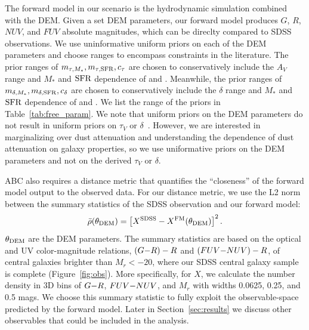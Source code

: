 The forward model in our scenario is the hydrodynamic simulation combined with
the DEM. Given a set DEM parameters, our forward model
produces $G$, $R$, $NUV$, and $FUV$ absolute magnitudes, which can be direclty
compared to SDSS observations. We use uninformative uniform priors on each of
the DEM parameters and choose ranges to encompass constraints in the
literature. The prior ranges of $m_{\tau,M_*}, m_{\tau,{\rm SFR}}, c_\tau$ are chosen to
conservatively include the $A_V$ range and $M_*$ and ${\rm SFR}$ dependence of
\cite{narayanan2018} and \cite{salim2020}. Meanwhile, the prior ranges of 
$m_{\delta,M_*}, m_{\delta,{\rm SFR}}, c_\delta$ are chosen to conservatively include the $\delta$
range and $M_*$ and ${\rm SFR}$ dependence of \cite{leja2017} and \cite{salim2018}. 
We list the range of the priors in Table~\ref{tab:free_param}. We note that
uniform priors on the DEM parameters do not result in uniform priors on
$\tau_V$ or $\delta$~\citep[\eg][]{handley2019}. However, we are interested in
marginalizing over dust attenuation and understanding the dependence of dust
attenuation on galaxy properties, so we use uniformative priors on the DEM
parameters and not on the derived $\tau_V$ or $\delta$. 

ABC also requires a distance metric that quantifies the ``closeness'' of the
forward model output to the observed data. For our distance metric, we use the
L2 norm between the summary statistics of the SDSS observation and our forward
model: 
\begin{equation} \label{eq:distance}
    \bar{\rho}(\theta_{\rm DEM}) = \left[X^{\rm SDSS} - X^{\rm FM}(\theta_{\rm DEM}) \right]^2.
\end{equation}
$\theta_{\rm DEM}$ are the DEM parameters. 
The summary statistics are based on the optical and UV color-magnitude
relations, $(G{-}R)-R$ and $(FUV{-}NUV)-R$, of central galaxies brighter than $M_r <
-20$, where our SDSS central galaxy sample is complete (Figure~\ref{fig:obs}).
More specifically, for $X$, we calculate the number density in 3D bins of $G{-}R$,
$FUV{-}NUV$, and $M_r$ with widths 0.0625, 0.25, and 0.5 mags. We choose this summary 
statistic to fully exploit the observable-space predicted by the forward model. 
Later in Section~\ref{sec:results} we discuss other observables that could be included
in the analysis. 

